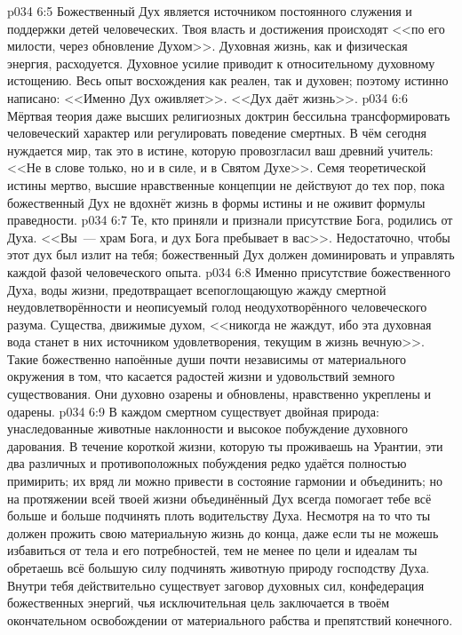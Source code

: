 \vs p034 6:5 \pc Божественный Дух является источником постоянного служения и поддержки детей человеческих. Твоя власть и достижения происходят <<по его милости, через обновление Духом>>. Духовная жизнь, как и физическая энергия, расходуется. Духовное усилие приводит к относительному духовному истощению. Весь опыт восхождения как реален, так и духовен; поэтому истинно написано: <<Именно Дух оживляет>>. <<Дух даёт жизнь>>.
\vs p034 6:6 Мёртвая теория даже высших религиозных доктрин бессильна трансформировать человеческий характер или регулировать поведение смертных. В чём сегодня нуждается мир, так это в истине, которую провозгласил ваш древний учитель: <<Не в слове только, но и в силе, и в Святом Духе>>. Семя теоретической истины мертво, высшие нравственные концепции не действуют до тех пор, пока божественный Дух не вдохнёт жизнь в формы истины и не оживит формулы праведности.
\vs p034 6:7 Те, кто приняли и признали присутствие Бога, родились от Духа. <<Вы~--- храм Бога, и дух Бога пребывает в вас>>. Недостаточно, чтобы этот дух был излит на тебя; божественный Дух должен доминировать и управлять каждой фазой человеческого опыта.
\vs p034 6:8 Именно присутствие божественного Духа, воды жизни, предотвращает всепоглощающую жажду смертной неудовлетворённости и неописуемый голод неодухотворённого человеческого разума. Существа, движимые духом, <<никогда не жаждут, ибо эта духовная вода станет в них источником удовлетворения, текущим в жизнь вечную>>. Такие божественно напоённые души почти независимы от материального окружения в том, что касается радостей жизни и удовольствий земного существования. Они духовно озарены и обновлены, нравственно укреплены и одарены.
\vs p034 6:9 \pc В каждом смертном существует двойная природа: унаследованные животные наклонности и высокое побуждение духовного дарования. В течение короткой жизни, которую ты проживаешь на Урантии, эти два различных и противоположных побуждения редко удаётся полностью примирить; их вряд ли можно привести в состояние гармонии и объединить; но на протяжении всей твоей жизни объединённый Дух всегда помогает тебе всё больше и больше подчинять плоть водительству Духа. Несмотря на то что ты должен прожить свою материальную жизнь до конца, даже если ты не можешь избавиться от тела и его потребностей, тем не менее по цели и идеалам ты обретаешь всё большую силу подчинять животную природу господству Духа. Внутри тебя действительно существует заговор духовных сил, конфедерация божественных энергий, чья исключительная цель заключается в твоём окончательном освобождении от материального рабства и препятствий конечного.
